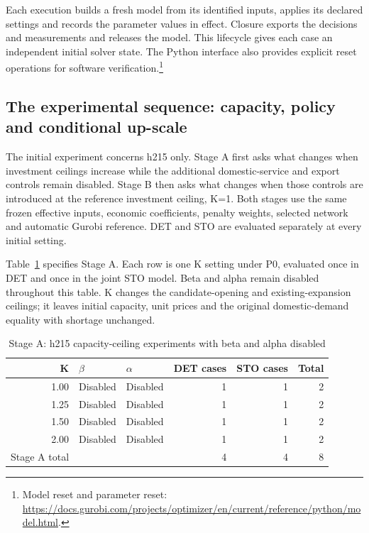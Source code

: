 \documentclass[11pt,a4paper]{article}
\newcommand{\technical}[2]{\footnote{#1: \url{#2}.}}
\begin{document}
Each execution builds a fresh model from its identified inputs, applies its declared settings and records the parameter values in effect. Closure exports the decisions and measurements and releases the model. This lifecycle gives each case an independent initial solver state. The Python interface also provides explicit reset operations for software verification.\technical{Model reset and parameter reset}{https://docs.gurobi.com/projects/optimizer/en/current/reference/python/model.html}


\subsection{The experimental sequence: capacity, policy and conditional up-scale}

The initial experiment concerns h215 only. Stage A first asks what changes when investment ceilings increase while the additional domestic-service and export controls remain disabled. Stage B then asks what changes when those controls are introduced at the reference investment ceiling, K=1. Both stages use the same frozen effective inputs, economic coefficients, penalty weights, selected network and automatic Gurobi reference. DET and STO are evaluated separately at every initial setting.


Table~\ref{tab:cases} specifies Stage A. Each row is one K setting under P0, evaluated once in DET and once in the joint STO model. Beta and alpha remain disabled throughout this table. K changes the candidate-opening and existing-expansion ceilings; it leaves initial capacity, unit prices and the original domestic-demand equality with shortage unchanged.

\begin{table}[H]\centering\small
\caption{Stage A: h215 capacity-ceiling experiments with beta and alpha disabled}\label{tab:cases}
\begin{tabular}{rllrrr}\toprule
K&$\beta$&$\alpha$&DET cases&STO cases&Total\\\midrule
1.00&Disabled&Disabled&1&1&2\\
1.25&Disabled&Disabled&1&1&2\\
1.50&Disabled&Disabled&1&1&2\\
2.00&Disabled&Disabled&1&1&2\\\midrule
Stage A total&&&4&4&8\\\bottomrule
\end{tabular}
\end{table}
\end{document}
